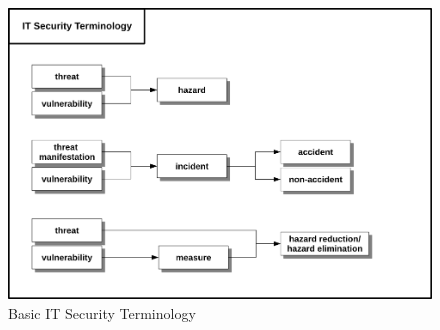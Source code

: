\begin{figure}
\centering
\includegraphics[width=\textwidth]{diagrams/png/itsecterminology.png}
\caption{Basic IT Security Terminology}
\label{fig:terminology}
\end{figure}
